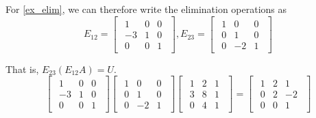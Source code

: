 \documentclass{article}
\begin{document}
For \ref{ex_elim}, we can therefore write the elimination operations as
\begin{equation}
    E_{12}=
    \begin{bmatrix}
        \begin{array}{ccc}
            1 & 0 & 0 \\
            -3 & 1 & 0 \\
            0 & 0 & 1
        \end{array}
    \end{bmatrix}, E_{23}=
    \begin{bmatrix}
        \begin{array}{ccc}
            1 & 0 & 0 \\
            0 & 1 & 0 \\
            0 & -2 & 1
        \end{array}
    \end{bmatrix}
\end{equation}

That is, $E_{23}(E_{12}A)=U$.
\begin{equation}
    \begin{bmatrix}
        \begin{array}{ccc}
            1 & 0 & 0 \\
            -3 & 1 & 0 \\
            0 & 0 & 1
        \end{array}
    \end{bmatrix}
    \begin{bmatrix}
        \begin{array}{ccc}
            1 & 0 & 0 \\
            0 & 1 & 0 \\
            0 & -2 & 1
        \end{array}
    \end{bmatrix}
    \begin{bmatrix}
        \begin{array}{ccc}
            1 & 2 & 1 \\
            3 & 8 & 1 \\
            0 & 4 & 1
        \end{array}
    \end{bmatrix}=
    \begin{bmatrix}
        \begin{array}{ccc}
            1 & 2 & 1 \\
            0 & 2 & -2 \\
            0 & 0 & 1
        \end{array}
    \end{bmatrix}
\end{equation}
\end{document}
